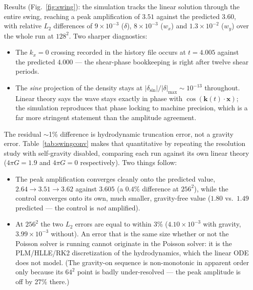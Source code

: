 \documentclass[11pt]{article}
\begin{document}
Results (Fig.~\ref{fig:swing}): the simulation tracks the linear solution through
the entire swing, reaching a peak amplification of $3.51$ against the predicted
$3.60$, with relative $L_2$ differences of $9\times10^{-3}$ ($\delta$),
$8\times10^{-3}$ ($w_x$) and $1.3\times10^{-2}$ ($w_y$) over the whole run at
$128^2$. Two sharper diagnostics:
\begin{itemize}
  \item The $k_x=0$ crossing recorded in the history file occurs at $t=4.005$
        against the predicted $4.000$ --- the shear-phase bookkeeping is right
        after twelve shear periods.
  \item The \emph{sine} projection of the density stays at
        $|\delta_{\sin}|/|\delta|_{\max} \sim 10^{-13}$ throughout. Linear theory
        says the wave stays exactly in phase with $\cos(\mathbf{k}(t)\!\cdot\!\mathbf{x})$;
        the simulation reproduces that phase locking to machine precision, which is
        a far more stringent statement than the amplitude agreement.
\end{itemize}
The residual $\sim$1\% difference is hydrodynamic truncation error, not a gravity
error. Table~\ref{tab:swingconv} makes that quantitative by repeating the
resolution study with self-gravity disabled, comparing each run against its own
linear theory ($4\pi G = 1.9$ and $4\pi G = 0$ respectively). Two things follow:
\begin{itemize}
  \item The peak amplification converges cleanly onto the predicted value,
        $2.64 \to 3.51 \to 3.62$ against $3.605$ (a $0.4\%$ difference at
        $256^2$), while the control converges onto its own, much smaller,
        gravity-free value ($1.80$ vs.\ $1.49$ predicted --- the control is
        \emph{not} amplified).
  \item At $256^2$ the two $L_2$ errors are equal to within 3\%
        ($4.10\times10^{-3}$ with gravity, $3.99\times10^{-3}$ without).
        An error that is the same size whether or not the Poisson solver is
        running cannot originate in the Poisson solver: it is the
        PLM/HLLE/RK2 discretization of the hydrodynamics, which the linear ODE
        does not model. (The gravity-on sequence is non-monotonic in apparent
        order only because its $64^2$ point is badly under-resolved --- the peak
        amplitude is off by 27\% there.)
\end{itemize}
\end{document}
